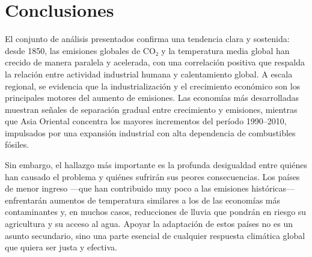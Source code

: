 \documentclass[
]{book}
\begin{document}
\chapter{Conclusiones}\label{conclusiones}

El conjunto de análisis presentados confirma una tendencia clara y sostenida: desde 1850, las emisiones globales de CO₂ y la temperatura media global han crecido de manera paralela y acelerada, con una correlación positiva que respalda la relación entre actividad industrial humana y calentamiento global. A escala regional, se evidencia que la industrialización y el crecimiento económico son los principales motores del aumento de emisiones. Las economías más desarrolladas muestran señales de separación gradual entre crecimiento y emisiones, mientras que Asia Oriental concentra los mayores incrementos del período 1990--2010, impulsados por una expansión industrial con alta dependencia de combustibles fósiles.

Sin embargo, el hallazgo más importante es la profunda desigualdad entre quiénes han causado el problema y quiénes sufrirán sus peores consecuencias. Los países de menor ingreso ---que han contribuido muy poco a las emisiones históricas--- enfrentarán aumentos de temperatura similares a los de las economías más contaminantes y, en muchos casos, reducciones de lluvia que pondrán en riesgo su agricultura y su acceso al agua. Apoyar la adaptación de estos países no es un asunto secundario, sino una parte esencial de cualquier respuesta climática global que quiera ser justa y efectiva.

  
\end{document}
